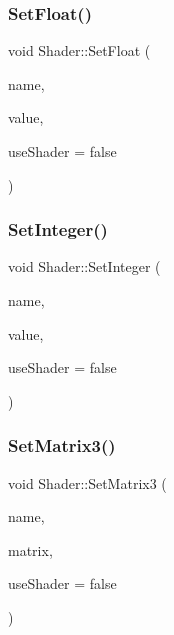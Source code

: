\mbox{\label{class_shader_af08ebcd8cd00553bce2134a476187496}} 
\subsubsection{\texorpdfstring{SetFloat()}{SetFloat()}}
{\footnotesize\ttfamily void Shader\+::\+Set\+Float (\begin{DoxyParamCaption}\item[{const G\+Lchar $\ast$}]{name,  }\item[{G\+Lfloat}]{value,  }\item[{G\+Lboolean}]{use\+Shader = {\ttfamily false} }\end{DoxyParamCaption})}

\mbox{\label{class_shader_a2c362029c73289761529a5d8b9d6a6b3}} 
\subsubsection{\texorpdfstring{SetInteger()}{SetInteger()}}
{\footnotesize\ttfamily void Shader\+::\+Set\+Integer (\begin{DoxyParamCaption}\item[{const G\+Lchar $\ast$}]{name,  }\item[{G\+Lint}]{value,  }\item[{G\+Lboolean}]{use\+Shader = {\ttfamily false} }\end{DoxyParamCaption})}

\mbox{\label{class_shader_a70230092a3435a7c0a05736225bb0dd1}} 
\subsubsection{\texorpdfstring{SetMatrix3()}{SetMatrix3()}}
{\footnotesize\ttfamily void Shader\+::\+Set\+Matrix3 (\begin{DoxyParamCaption}\item[{const G\+Lchar $\ast$}]{name,  }\item[{const glm\+::mat3 \&}]{matrix,  }\item[{G\+Lboolean}]{use\+Shader = {\ttfamily false} }\end{DoxyParamCaption})}

